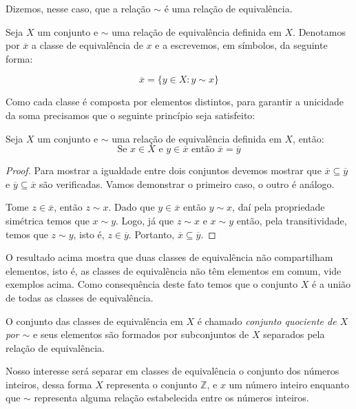	
	Dizemos, nesse caso, que a rela\c{c}\~ao $\sim$ \'e uma rela\c{c}\~{a}o de equival\^encia. 
		
	Seja $X$ um conjunto e $\sim$ uma rela\c{c}\~{a}o de equival\^{e}ncia definida em $X$. Denotamos por $\overline{x}$ 
	a classe de equival\^{e}ncia de $x$ e a escrevemos, em s\'{i}mbolos, da seguinte forma:
	
	                     $$\overline{x}=\{y\in X: y\sim x\}$$
	
	Como cada classe \'{e} composta por elementos distintos, para garantir a unicidade da soma precisamos que o 
	seguinte princ\'{i}pio seja satisfeito:
	
	\begin{Th}
		Seja $X$ um conjunto e $\sim$ uma rela\c{c}\~{a}o de equival\^{e}ncia definida em $X$, ent\~{a}o:
		$$\textrm{Se } x\in X \textrm{ e } y\in\overline{x} \textrm{ ent\~{a}o } \overline{x}=\overline{y}$$
	\end{Th}
	
	\begin{proof}
		Para mostrar a igualdade entre dois conjuntos devemos mostrar que $\overline{x}\subseteq\overline{y}$
		e $\overline{y}\subseteq\overline{x}$ s\~ao verificadas. Vamos demonstrar o primeiro caso, o outro \'{e} an\'{a}logo.
			
		Tome $z\in\overline{x}$, ent\~{a}o $z\sim x$. Dado que $y\in\overline{x}$
			ent\~{a}o $y\sim x$, da\'{i} pela propriedade sim\'{e}trica temos que $x\sim y$. Logo, j\'{a} que 
			$z\sim x$ e $x\sim y$ ent\~{a}o, pela transitividade, temos que $z\sim y$, isto \'{e}, $z\in\overline{y}$.
			Portanto, $\overline{x}\subseteq\overline{y}$. 
	\end{proof}
	
	O resultado acima mostra que duas classes de equival\^{e}ncia n\~{a}o compartilham elementos, isto \'{e}, as classes de equival\^{e}ncia
	n\~{a}o t\^{e}m elementos em comum, vide exemplos acima. Como consequ\^{e}ncia deste fato temos que o conjunto $X$ \'{e} a 
	uni\~{a}o de todas as classes de equival\^{e}ncia. 
	
	O conjunto das classes de equival\^{e}ncia em $X$ \'{e} chamado \textit{conjunto quociente de $X$ por $\sim$} e 
	seus elementos s\~{a}o formados por subconjuntos de $X$ separados pela rela\c{c}\~{a}o de equival\^{e}ncia.
	
	Nosso interesse ser\'{a} separar em classes de equival\^{e}ncia o conjunto dos n\'{u}meros inteiros, dessa forma $X$ representa
	o conjunto $\mathbb{Z}$, e $x$ um n\'{u}mero inteiro enquanto que
	$\sim$ representa alguma rela\c{c}\~{a}o estabelecida entre os n\'{u}meros inteiros. 
	
